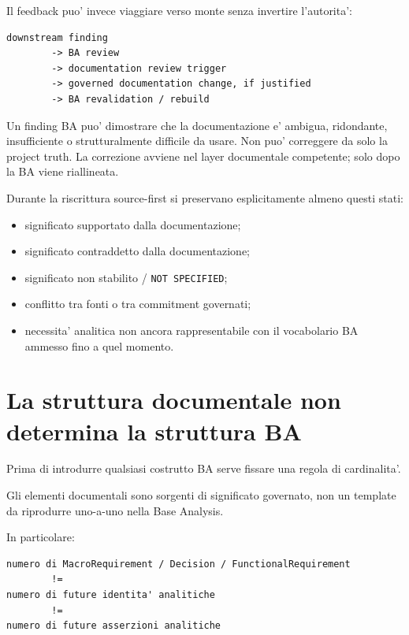 \documentclass[11pt,a4paper]{article}
\begin{document}
Il feedback puo' invece viaggiare verso monte senza invertire l'autorita':

\begin{lstlisting}
downstream finding
        -> BA review
        -> documentation review trigger
        -> governed documentation change, if justified
        -> BA revalidation / rebuild
\end{lstlisting}

\begin{ddtacore}[title={No authority inversion}]
Un finding BA puo' dimostrare che la documentazione e' ambigua, ridondante, insufficiente o strutturalmente difficile da usare. Non puo' correggere da solo la project truth. La correzione avviene nel layer documentale competente; solo dopo la BA viene riallineata.
\end{ddtacore}

Durante la riscrittura source-first si preservano esplicitamente almeno questi stati:

\begin{itemize}
  \item significato supportato dalla documentazione;
  \item significato contraddetto dalla documentazione;
  \item significato non stabilito / \texttt{NOT SPECIFIED};
  \item conflitto tra fonti o tra commitment governati;
  \item necessita' analitica non ancora rappresentabile con il vocabolario BA ammesso fino a quel momento.
\end{itemize}

\section{La struttura documentale non determina la struttura BA}

Prima di introdurre qualsiasi costrutto BA serve fissare una regola di cardinalita'.

\begin{ddtaprinciple}[title={Indipendenza strutturale}]
Gli elementi documentali sono sorgenti di significato governato, non un template da riprodurre uno-a-uno nella Base Analysis.
\end{ddtaprinciple}

In particolare:

\begin{lstlisting}
numero di MacroRequirement / Decision / FunctionalRequirement
        !=
numero di future identita' analitiche
        !=
numero di future asserzioni analitiche
\end{lstlisting}
\end{document}
